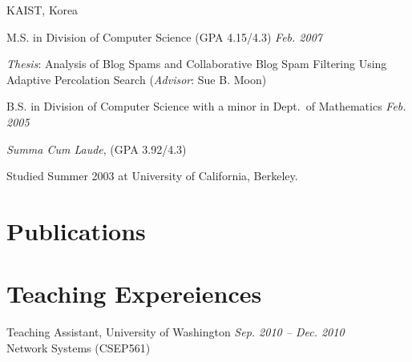 \documentclass[margin,line]{res}
\newenvironment{list1}{
  \begin{list}{\ding{113}}{%
      \setlength{\itemsep}{0in}
      \setlength{\parsep}{0in} \setlength{\parskip}{0in}
      \setlength{\topsep}{0in} \setlength{\partopsep}{0in}
      \setlength{\leftmargin}{0.17in}}}{\end{list}}
\begin{document}
\begin{resume}
KAIST, Korea  \\
\vspace*{-.1in}
\begin{list1}
\item[] M.S. in Division of Computer Science (GPA 4.15/4.3) \hfill{\it Feb. 2007}
\item[] \textit{Thesis}: Analysis of Blog Spams and Collaborative Blog Spam Filtering Using Adaptive Percolation Search (\textit{Advisor}: Sue B. Moon)
\item[] 
\item[] B.S. in Division of Computer Science with a minor in Dept.~of Mathematics \hfill{\it Feb. 2005}
\item[] \textit{Summa Cum Laude}, (GPA 3.92/4.3)
\item[] Studied Summer 2003 at University of California, Berkeley. 
\end{list1}




\section{\sc Publications}
\nocite{*}



\section{\sc Teaching Expereiences}
Teaching Assistant, University of Washington \hfill{\it Sep. 2010 -- Dec. 2010} \\
Network Systems (CSEP561)


\end{resume}
\end{document}
